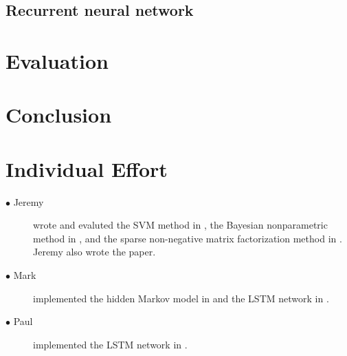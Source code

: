 \documentclass[5p]{elsarticle}
\begin{document}
\subsection{Recurrent neural network}

\section{Evaluation}


\section{Conclusion}





\section{Individual Effort}
\begin{description}
\item[$\bullet$ Jeremy] wrote and evaluted the SVM method in \cite{poliner2006discriminative}, the Bayesian nonparametric method in \cite{blei2010bayesian}, and the sparse non-negative matrix factorization method in \cite{abdallah2004polyphonic}. Jeremy also wrote the paper.
\item[$\bullet$ Mark] implemented the hidden Markov model in \cite{poliner2006discriminative} and the LSTM network in \cite{bock2012polyphonic}.
\item[$\bullet$ Paul] implemented the LSTM network in \cite{bock2012polyphonic}.
\end{description}

\end{document}
